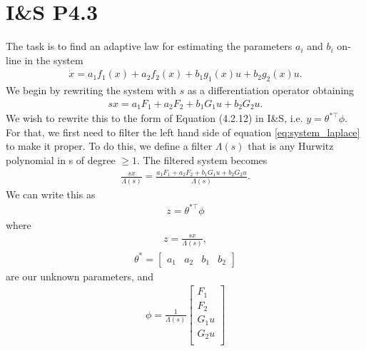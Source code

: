 \documentclass[]{article}
\begin{document}
\section{I\&S P4.3}
The task is to find an adaptive law for estimating the parameters $a_i$ and $b_i$ on-line in the system
\begin{equation}\begin{aligned}
\dot x = a_1f_1(x)+a_2f_2(x)+b_1g_1(x)u+b_2g_2(x)u.
\end{aligned}\end{equation}
We begin by rewriting the system with $s$ as a differentiation operator obtaining
\begin{equation}\begin{aligned}
\label{eq:system_laplace}
s x = a_1F_1+a_2F_2+b_1G_1u+b_2G_2u.
\end{aligned}\end{equation}
We wish to rewrite this to the form of Equation (4.2.12) in I\&S, i.e. $y=\theta^{*\top} \phi$. For that, we first need to filter the left hand side of equation \eqref{eq:system_laplace} to make it proper. To do this, we define a filter $\Lambda(s)$ that is any Hurwitz polynomial in s of degree $\geq 1$. The filtered system becomes
\begin{equation}\begin{aligned}
\frac{s x}{\Lambda(s)} = \frac{a_1F_1+a_2F_2+b_1G_1u+b_2G_2u}{\Lambda(s)}.
\end{aligned}\end{equation}
We can write this as
\begin{equation}\begin{aligned}
z = \theta^{*\top}\phi
\end{aligned}\end{equation}
where
\begin{equation}\begin{aligned}
z = \frac{sx}{\Lambda(s)},
\end{aligned}\end{equation}
\begin{equation}\begin{aligned}
\theta^* =
\begin{bmatrix}
a_1 & a_2 & b_1 & b_2
\end{bmatrix}
\end{aligned}\end{equation}
are our unknown parameters, and
\begin{equation}\begin{aligned}
\phi =
\frac{1}{\Lambda(s)}
\begin{bmatrix}
F_1 \\
F_2 \\
G_1u \\
G_2u \\
\end{bmatrix}
\end{aligned}\end{equation}
\end{document}
